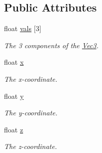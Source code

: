 \subsection*{Public Attributes}
\begin{DoxyCompactItemize}
\item 
float \hyperlink{classgofxmath_1_1_vec3_a3971d9f465d93491b33f68a9460721a5}{vals} \mbox{[}3\mbox{]}
\begin{DoxyCompactList}\small\item\em The 3 components of the \hyperlink{classgofxmath_1_1_vec3}{Vec3}. \end{DoxyCompactList}\item 
float \hyperlink{classgofxmath_1_1_vec3_a507868ff65b4e42f80da14bf355ee10a}{x}
\begin{DoxyCompactList}\small\item\em The x-\/coordinate. \end{DoxyCompactList}\item 
float \hyperlink{classgofxmath_1_1_vec3_afd348ae9f3c31f6215e91d8b5adcea5f}{y}
\begin{DoxyCompactList}\small\item\em The y-\/coordinate. \end{DoxyCompactList}\item 
float \hyperlink{classgofxmath_1_1_vec3_a201779cb941bb4a6478ff13c897494ba}{z}
\begin{DoxyCompactList}\small\item\em The z-\/coordinate. \end{DoxyCompactList}\end{DoxyCompactItemize}
